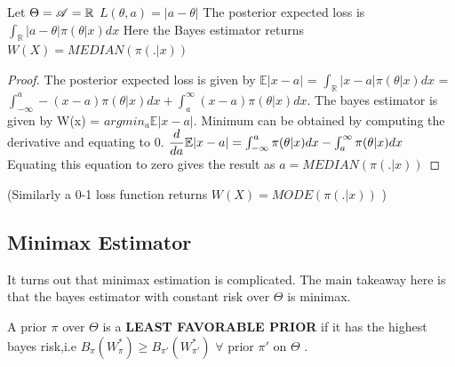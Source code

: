 \documentclass[a4paper,english,12pt]{article}
\begin{document}
\begin{exmp}
	Let $\Theta\space=\space\mathscr{A}\space=\space\mathbb{R}$
	\newline\hspace*{2cm} $L(\theta,a) = |a-\theta|$
	\newline The posterior expected loss is
	\newline \hspace*{2cm} $\int_{\mathbb{R}}^{}|a-\theta|\pi(\theta\vert x)dx$
	\newline Here the Bayes estimator returns $W(X) = MEDIAN(\pi(.\vert x))$
	\begin{proof}
		The posterior expected loss is given by
		\newline $\mathbb{E}\vert x-a \vert$ = $\int_{\mathbb{R}}^{}\vert x-a \vert \pi(\theta\vert x)dx$ = $\int_{-\infty}^{a}-(x-a)\pi(\theta\vert x)dx + \int_{a}^{\infty}(x-a)\pi(\theta\vert x)dx$.
		\newline The bayes estimator is given by 
		\newline\hspace*{2cm} W(x) =  $argmin_a \mathbb{E}\vert x-a \vert$.
		\newline Minimum can be obtained by computing the derivative and equating to 0. 
		\newline\hspace*{2cm} $\dfrac{d}{da}\mathbb{E}\vert x-a \vert = \int_{-\infty}^{a}\pi(\theta\vert x)dx\space - \space \int_{a}^{\infty}\pi(\theta\vert x)dx$
		\newline Equating this equation to zero gives the result as $a = MEDIAN(\pi(.\vert x))$
	\end{proof}
\end{exmp}
\vspace*{3mm} (Similarly a 0-1 loss function returns $W(X) = MODE(\pi(.\vert x))$ )

\subsection{Minimax Estimator}
It turns out that minimax estimation is complicated. The main takeaway here is that the bayes estimator with constant risk over $\Theta$ is minimax.
\begin{defn}  A prior $\pi$ over $\Theta$ is a \textbf{LEAST FAVORABLE PRIOR} if it has the highest bayes risk,i.e
	\newline\hspace*{2cm} $B_{\pi}(W_\pi^*) \geq  B_{\pi\prime}(W_{\pi\prime}^*)$ $\forall$ prior $\pi\prime$ on $\Theta$ .
\end{defn}
\end{document}
